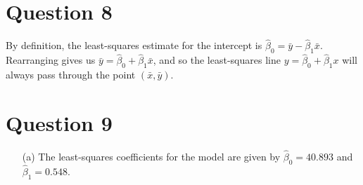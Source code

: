 \documentclass[10pt]{article}
\begin{document}
\section{Question 8} \noindent
By definition, the least-squares estimate for the intercept is \(\hat{\beta}_0 = \bar{y} - \hat{\beta}_1 \bar{x}\).
Rearranging gives us \(\bar{y} = \hat{\beta}_0 + \hat{\beta}_1 \bar{x}\), and so the least-squares line \(y = \hat{\beta}_0 + \hat{\beta}_1 x\) will always 
pass through the point \((\bar{x}, \bar{y})\).

\section{Question 9} \noindent
\begin{itemize}
    \item[(a)] The least-squares coefficients for the model are given by \(\hat{\beta}_0 = 40.893\) and \(\hat{\beta}_1 = 0.548\).
\end{itemize}

\end{document}
